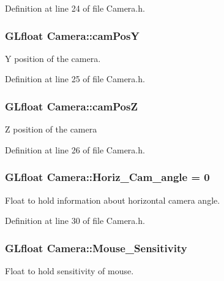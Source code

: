 Definition at line 24 of file Camera.\+h.

\hypertarget{class_camera_adeb153325cb42a77c6114ab597c69cfa}{}
\subsubsection[{cam\+Pos\+Y}]{\setlength{\rightskip}{0pt plus 5cm}G\+Lfloat Camera\+::cam\+Pos\+Y}\label{class_camera_adeb153325cb42a77c6114ab597c69cfa}
Y position of the camera. 

Definition at line 25 of file Camera.\+h.

\hypertarget{class_camera_a4fbae1f797ffb17794d38b2aea4bcc48}{}
\subsubsection[{cam\+Pos\+Z}]{\setlength{\rightskip}{0pt plus 5cm}G\+Lfloat Camera\+::cam\+Pos\+Z}\label{class_camera_a4fbae1f797ffb17794d38b2aea4bcc48}
Z position of the camera 

Definition at line 26 of file Camera.\+h.

\hypertarget{class_camera_a6d9ee75d6ad778196e1083dd5a0167ad}{}
\subsubsection[{Horiz\+\_\+\+Cam\+\_\+angle}]{\setlength{\rightskip}{0pt plus 5cm}G\+Lfloat Camera\+::\+Horiz\+\_\+\+Cam\+\_\+angle = 0}\label{class_camera_a6d9ee75d6ad778196e1083dd5a0167ad}
Float to hold information about horizontal camera angle. 

Definition at line 30 of file Camera.\+h.

\hypertarget{class_camera_ada530cf7b97b15431c729ddc3435d702}{}
\subsubsection[{Mouse\+\_\+\+Sensitivity}]{\setlength{\rightskip}{0pt plus 5cm}G\+Lfloat Camera\+::\+Mouse\+\_\+\+Sensitivity}\label{class_camera_ada530cf7b97b15431c729ddc3435d702}
Float to hold sensitivity of mouse. 

